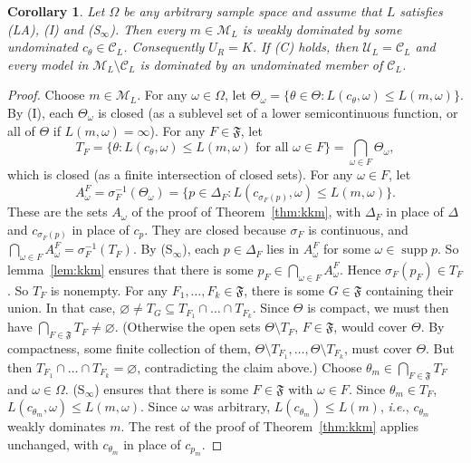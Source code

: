 \documentclass[11pt]{article}
\newtheorem{corollary}[theorem]{Corollary}
\theoremstyle{definition}
\theoremstyle{remark}
\newcommand{\M}{\mathcal M}
\newcommand{\C}{\mathcal C}
\newcommand{\F}{\mathfrak F}
\newcommand{\U}{\mathcal U}
\newcommand{\supp}{\operatorname{supp}}
\begin{document}
\begin{corollary}\label{cor:infinite}
Let $\Omega$ be any arbitrary sample space and assume that $L$ satisfies (LA), (I) and (S$_\infty$). Then every $m\in\M_L$ is weakly dominated by some undominated $c_\theta\in\C_L$. Consequently $U_R=K$. If (C) holds, then $\U_L=\C_L$ and every model in $\M_L\setminus\C_L$ is dominated by an undominated member of $\C_L$. 
\end{corollary}
\begin{proof}
Choose $m\in\M_L$. For any $\omega\in\Omega$, let $\Theta_\omega=\{\theta\in\Theta:L(c_\theta,\omega)\le L(m,\omega)\}$. By (I), each $\Theta_\omega$ is closed (as a sublevel set of a lower semicontinuous function, or all of $\Theta$ if $L(m,\omega)=\infty$). For any $F\in\F$, let
\[
 T_F=\{\theta:L(c_\theta,\omega)\le L(m,\omega)\text{ for all }\omega\in F\} = \bigcap_{\omega\in F}\Theta_\omega,
\]
which is closed (as a finite intersection of closed sets). For any $\omega\in F$, let 
\[
A^F_\omega=\sigma_F^{-1}(\Theta_\omega)=\{p\in\Delta_F:L(c_{\sigma_F(p)},\omega)\le L(m,\omega)\}.
\]
These are the sets $A_\omega$ of the proof of Theorem~\ref{thm:kkm}, with $\Delta_F$ in place of $\Delta$ and $c_{\sigma_F(p)}$ in place of $c_p$. They are closed because $\sigma_F$ is continuous, and $\bigcap_{\omega\in F}A^F_\omega=\sigma_F^{-1}(T_F)$. By (S$_\infty$), each $p\in\Delta_F$ lies in $A^F_\omega$ for some $\omega\in\supp p$. So lemma~\ref{lem:kkm} ensures that there is some $p_F\in\bigcap_{\omega\in F}A^F_\omega$. Hence $\sigma_F(p_F)\in T_F$. So $T_F$ is nonempty. For any $F_1,\dots,F_k\in\F$, there is some $G\in\F$ containing their union. In that case, $\varnothing\ne T_G\subseteq T_{F_1}\cap\dots\cap T_{F_k}$. Since $\Theta$ is compact, we must then have $\bigcap_{F\in\F}T_F\neq \varnothing$. (Otherwise the open sets $\Theta\setminus T_F$, $F\in\F$, would cover $\Theta$. By compactness, some finite collection of them, $\Theta\setminus T_{F_1},\dots,\Theta\setminus T_{F_k}$, must cover $\Theta$. But then $T_{F_1}\cap\dots\cap T_{F_k}=\varnothing$, contradicting the claim above.) Choose $\theta_m\in\bigcap_{F\in\F}T_F$ and $\omega\in\Omega$. (S$_\infty$) ensures that there is some $F\in\F$ with $\omega\in F$. Since $\theta_m\in T_F$, $L(c_{\theta_m},\omega)\le L(m,\omega)$. Since $\omega$ was arbitrary, $L(c_{\theta_m})\le L(m)$, \textit{i.e.}, $c_{\theta_m}$ weakly dominates $m$. The rest of the proof of Theorem~\ref{thm:kkm} applies unchanged, with $c_{\theta_m}$ in place of $c_{p_m}$.
\end{proof}
\end{document}

